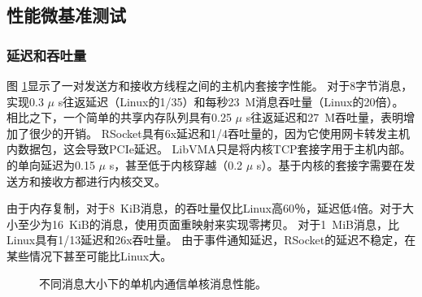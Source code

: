 \subsection{性能微基准测试}
\label{socksdirect:subsec:microbenchmark}

\subsubsection{延迟和吞吐量}



图 \ref {socksdirect:fig:eval-msgsize-intra}显示了一对发送方和接收方线程之间的主机内套接字性能。
对于8字节消息，\sys 实现0.3 $ \mu $ s往返延迟（Linux的1/35）和每秒23~M消息吞吐量（Linux的20倍）。
相比之下，一个简单的共享内存队列具有0.25 $ \mu $ s往返延迟和27~M吞吐量，表明\sys 增加了很少的开销。
RSocket具有6x延迟和1/4吞吐量的\sys  {}，因为它使用网卡转发主机内数据包，这会导致PCIe延迟。
LibVMA只是将内核TCP套接字用于主机内部。
\sys  {}的单向延迟为0.15 $ \mu $ s，甚至低于内核穿越（0.2 $ \mu $ s）。基于内核的套接字需要在发送方和接收方都进行内核交叉。


由于内存复制，对于8~KiB消息，\sys 的吞吐量仅比Linux高60％，延迟低4倍。对于大小至少为16~KiB的消息，\sys 使用页面重映射来实现零拷贝。
对于1~MiB消息，\sys 比Linux具有1/13延迟和26x吞吐量。
由于事件通知延迟，RSocket的延迟不稳定，在某些情况下甚至可能比Linux大。



\begin{figure}[htbp]
	\centering
	
	\caption{不同消息大小下的单机内通信单核消息性能。}
	\label{socksdirect:fig:eval-msgsize-intra}
\end{figure}


